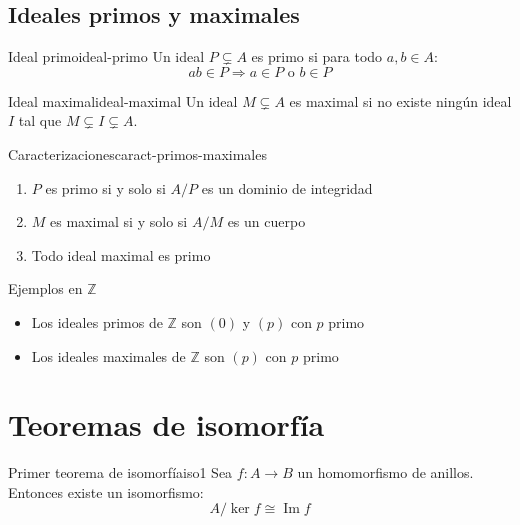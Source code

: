 \subsection{Ideales primos y maximales}

\begin{definition}{Ideal primo}{ideal-primo}
    Un ideal \(P \subsetneq A\) es {primo} si para todo \(a, b \in A\):
    \[
    ab \in P \Rightarrow a \in P \text{ o } b \in P
    \]
\end{definition}

\begin{definition}{Ideal maximal}{ideal-maximal}
    Un ideal \(M \subsetneq A\) es {maximal} si no existe ningún ideal \(I\) tal que \(M \subsetneq I \subsetneq A\).
\end{definition}

\begin{lemma}{Caracterizaciones}{caract-primos-maximales}
    \begin{enumerate}
        \item \(P\) es primo si y solo si \(A/P\) es un dominio de integridad
        \item \(M\) es maximal si y solo si \(A/M\) es un cuerpo
        \item Todo ideal maximal es primo
    \end{enumerate}
\end{lemma}

\begin{example}{Ejemplos en \(\mathbb{Z}\)}{}
    \begin{itemize}
        \item Los ideales primos de \(\mathbb{Z}\) son \((0)\) y \((p)\) con \(p\) primo
        \item Los ideales maximales de \(\mathbb{Z}\) son \((p)\) con \(p\) primo
    \end{itemize}
\end{example}

\clearpage
\section{Teoremas de isomorfía}

\begin{theorem}{Primer teorema de isomorfía}{iso1}
    Sea \(f: A \to B\) un homomorfismo de anillos. Entonces existe un isomorfismo:
    \[
    A/\ker f \cong \operatorname{Im} f
    \]
\end{theorem}

